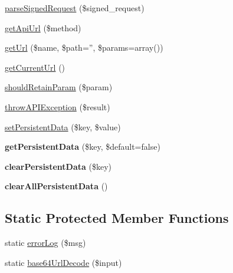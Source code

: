 \begin{DoxyCompactItemize}
\hyperlink{class_base_facebook_abd774acd4ace03e468a034d83e88416a}{parse\-Signed\-Request} (\$signed\-\_\-request)
\item 
\hyperlink{class_base_facebook_a3f443bdaad76813687f389b130284f0c}{get\-Api\-Url} (\$method)
\item 
\hyperlink{class_base_facebook_a96b679deac74fb2e12f5a43082c7e8ca}{get\-Url} (\$name, \$path='', \$params=array())
\item 
\hyperlink{class_base_facebook_a201542500ee128973c85ba86a15d505f}{get\-Current\-Url} ()
\item 
\hyperlink{class_base_facebook_a97ba740637372de0bc8545e149ac78e9}{should\-Retain\-Param} (\$param)
\item 
\hyperlink{class_base_facebook_a9586758de0577216593cf5cb23bca844}{throw\-A\-P\-I\-Exception} (\$result)
\item 
\hyperlink{class_base_facebook_a7c395efe8594a2afd06b462e8858fee8}{set\-Persistent\-Data} (\$key, \$value)
\item 
\hypertarget{class_base_facebook_a2d31791ed8c3a7d09a4338aec8749a7d}{{\bfseries get\-Persistent\-Data} (\$key, \$default=false)}\label{class_base_facebook_a2d31791ed8c3a7d09a4338aec8749a7d}

\item 
\hypertarget{class_base_facebook_afff378a3ec897db92a642279b5b4b738}{{\bfseries clear\-Persistent\-Data} (\$key)}\label{class_base_facebook_afff378a3ec897db92a642279b5b4b738}

\item 
\hypertarget{class_base_facebook_ad0f8fc371cee2e8a6aaf5972bd5e7d6a}{{\bfseries clear\-All\-Persistent\-Data} ()}\label{class_base_facebook_ad0f8fc371cee2e8a6aaf5972bd5e7d6a}

\end{DoxyCompactItemize}
\subsection*{Static Protected Member Functions}
\begin{DoxyCompactItemize}
\item 
static \hyperlink{class_base_facebook_a9f8d1ae264b45ba5ead959705bdcf1e8}{error\-Log} (\$msg)
\item 
static \hyperlink{class_base_facebook_a99d1710c462be3995a1974d8e5f9599f}{base64\-Url\-Decode} (\$input)
\end{DoxyCompactItemize}
